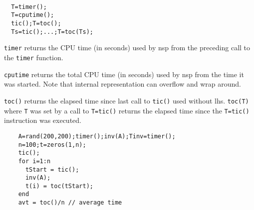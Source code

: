 \begin{mandesc}
   \\
    \\ 
   \\
\end{mandesc}
\begin{calling_sequence}
\begin{verbatim}
  T=timer();
  T=cputime();
  tic();T=toc();
  Ts=tic();...;T=toc(Ts);
\end{verbatim}
\end{calling_sequence}
\begin{mandescription}
\noindent\verb!timer!  returns the CPU time (in seconds) used by nsp from the 
  preceding call to the \verb!timer! function. 

\noindent\verb!cputime! returns the total CPU time (in seconds) used by nsp 
  from the time it was started. Note that internal representation
  can overflow and wrap around.

\noindent\verb!toc()! returns the elapsed time since last call to \verb!tic()!
  used without lhs. \verb!toc(T)! where \verb!T! was set by a call to 
  \verb!T=tic()! returns the elapsed time since the \verb!T=tic()! 
  instruction was executed. 
\end{mandescription}
\begin{examples}
  \begin{Verbatim}
    A=rand(200,200);timer();inv(A);Tinv=timer();
    n=100;t=zeros(1,n);
    tic();
    for i=1:n 
      tStart = tic();
      inv(A);
      t(i) = toc(tStart);
    end
    avt = toc()/n // average time 
  \end{Verbatim}
\end{examples}

